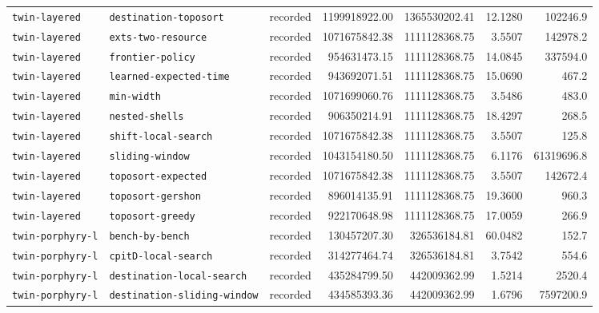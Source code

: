 \begin{longtable}{>{\raggedright\arraybackslash}p{}>{\raggedright\arraybackslash}p{}r r r r r}
\texttt{twin\allowbreak-layered} & \texttt{destination\allowbreak-toposort} & recorded & 1199918922.00 & 1365530202.41 & 12.1280 & 102246.9 \\
\texttt{twin\allowbreak-layered} & \texttt{exts\allowbreak-two\allowbreak-resource} & recorded & 1071675842.38 & 1111128368.75 & 3.5507 & 142978.2 \\
\texttt{twin\allowbreak-layered} & \texttt{frontier\allowbreak-policy} & recorded & 954631473.15 & 1111128368.75 & 14.0845 & 337594.0 \\
\texttt{twin\allowbreak-layered} & \texttt{learned\allowbreak-expected\allowbreak-time} & recorded & 943692071.51 & 1111128368.75 & 15.0690 & 467.2 \\
\texttt{twin\allowbreak-layered} & \texttt{min\allowbreak-width} & recorded & 1071699060.76 & 1111128368.75 & 3.5486 & 483.0 \\
\texttt{twin\allowbreak-layered} & \texttt{nested\allowbreak-shells} & recorded & 906350214.91 & 1111128368.75 & 18.4297 & 268.5 \\
\texttt{twin\allowbreak-layered} & \texttt{shift\allowbreak-local\allowbreak-search} & recorded & 1071675842.38 & 1111128368.75 & 3.5507 & 125.8 \\
\texttt{twin\allowbreak-layered} & \texttt{sliding\allowbreak-window} & recorded & 1043154180.50 & 1111128368.75 & 6.1176 & 61319696.8 \\
\texttt{twin\allowbreak-layered} & \texttt{toposort\allowbreak-expected} & recorded & 1071675842.38 & 1111128368.75 & 3.5507 & 142672.4 \\
\texttt{twin\allowbreak-layered} & \texttt{toposort\allowbreak-gershon} & recorded & 896014135.91 & 1111128368.75 & 19.3600 & 960.3 \\
\texttt{twin\allowbreak-layered} & \texttt{toposort\allowbreak-greedy} & recorded & 922170648.98 & 1111128368.75 & 17.0059 & 266.9 \\
\texttt{twin\allowbreak-porphyry\allowbreak-l} & \texttt{bench\allowbreak-by\allowbreak-bench} & recorded & 130457207.30 & 326536184.81 & 60.0482 & 152.7 \\
\texttt{twin\allowbreak-porphyry\allowbreak-l} & \texttt{cpitD\allowbreak-local\allowbreak-search} & recorded & 314277464.74 & 326536184.81 & 3.7542 & 554.6 \\
\texttt{twin\allowbreak-porphyry\allowbreak-l} & \texttt{destination\allowbreak-local\allowbreak-search} & recorded & 435284799.50 & 442009362.99 & 1.5214 & 2520.4 \\
\texttt{twin\allowbreak-porphyry\allowbreak-l} & \texttt{destination\allowbreak-sliding\allowbreak-window} & recorded & 434585393.36 & 442009362.99 & 1.6796 & 7597200.9 \\

\end{longtable}
